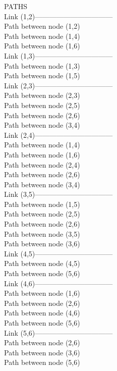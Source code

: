PATHS\\
Link (1,2)---------------------------------\\
Path between node (1,2)\\
Path between node (1,4)\\
Path between node (1,6)\\
Link (1,3)---------------------------------\\
Path between node (1,3)\\
Path between node (1,5)\\
Link (2,3)---------------------------------\\
Path between node (2,3)\\
Path between node (2,5)\\
Path between node (2,6)\\
Path between node (3,4)\\
Link (2,4)---------------------------------\\
Path between node (1,4)\\
Path between node (1,6)\\
Path between node (2,4)\\
Path between node (2,6)\\
Path between node (3,4)\\
Link (3,5)---------------------------------\\
Path between node (1,5)\\
Path between node (2,5)\\
Path between node (2,6)\\
Path between node (3,5)\\
Path between node (3,6)\\
Link (4,5)---------------------------------\\
Path between node (4,5)\\
Path between node (5,6)\\
Link (4,6)---------------------------------\\
Path between node (1,6)\\
Path between node (2,6)\\
Path between node (4,6)\\
Path between node (5,6)\\
Link (5,6)---------------------------------\\
Path between node (2,6)\\
Path between node (3,6)\\
Path between node (5,6)\\



